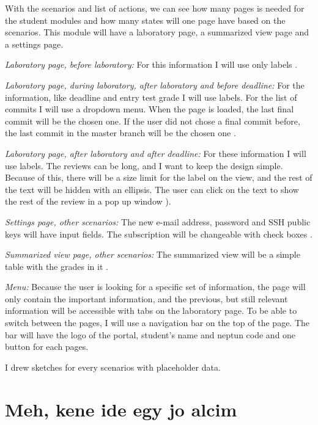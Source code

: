 With the scenarios and list of actions, we can see how many pages is needed for the student modules and how many states will one page have based on the scenarios. This module will have a laboratory page, a summarized view page and a settings page.

\emph{Laboratory page, before laboratory:} For this information I will use only labels .

\emph{Laboratory page, during laboratory, after laboratory and before deadline:} For the information, like deadline and entry test grade I will use labels. For the list of commits I will use a dropdown menu. When the page is loaded, the last final commit will be the chosen one. If the user did not chose a final commit before, the last commit in the master branch will be the chosen one .

\emph{Laboratory page, after laboratory and after deadline:} For these information I will use labels. The reviews can be long, and I want to keep the design simple. Because of this, there will be a size limit for the label on the view, and the rest of the text will be hidden with an ellipsis. The user can click on the text to show the rest of the review in a pop up window ).

\emph{Settings page, other scenarios:} The new e-mail address, password and SSH public keys will have input fields. The subscription will be changeable with check boxes . 

\emph{Summarized view page, other scenarios:} The summarized view will be a simple table with the grades in it .

\emph{Menu:} Because the user is looking for a specific set of information, the page will only contain the important information, and the previous, but still relevant information will be accessible with tabs on the laboratory page. To be able to switch between the pages, I will use a navigation bar on the top of the page. The bar will have the logo of the portal, student's name and neptun code and one button for each pages.

I drew sketches  for every scenarios with placeholder data. 

\section{Meh, kene ide egy jo alcim}




